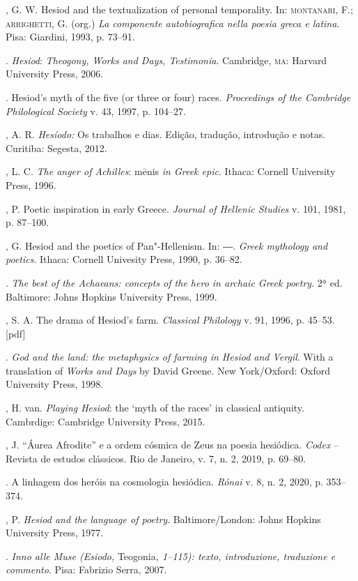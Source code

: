 \begin{bibliohedra}
, G. W. Hesiod and the textualization of personal temporality. In:
\textsc{montanari}, F.; \textsc{arrighetti}, G. (org.) \emph{La componente autobiografica
nella poesia greca e latina}. Pisa: Giardini, 1993, p. 73--91.

\titidem. \emph{Hesiod}: \emph{Theogony, Works and Days, Testimonia}.
Cambridge, \textsc{ma}: Harvard University Press, 2006.

\titidem. Hesiod's myth of the five (or three or four) races. \emph{Proceedings
of the Cambridge Philological Society} v. 43, 1997, p. 104--27.

, A. R. \emph{Hesíodo:} Os trabalhos e dias. Edição, tradução,
introdução e notas. Curitiba: Segesta, 2012.

, L. C. \emph{The anger of Achilles}: mēnis \emph{in Greek
epic}. Ithaca: Cornell University Press, 1996.

, P. Poetic inspiration in early Greece. \emph{Journal of Hellenic
Studies} v. 101, 1981, p. 87--100.

, G. Hesiod and the poetics of Pan"-Hellenism. In: ―. \emph{Greek
mythology and poetics}. Ithaca: Cornell Univesity Press, 1990, p. 36--82.

\titidem. \emph{The best of the Achaeans: concepts of the hero in archaic Greek
poetry}. 2ª ed. Baltimore: Johns Hopkins University Press, 1999.

, S. A. The drama of Hesiod's farm. \emph{Classical Philology} v.
91, 1996, p. 45--53. {[}pdf{]}

\titidem. \emph{God and the land: the metaphysics of farming in Hesiod and
Vergil}. With a translation of \emph{Works and Days} by David Greene.
New York/Oxford: Oxford University Press, 1998.

, H. van. \emph{Playing Hesiod}: the `myth of the races' in
classical antiquity. Cambrdige: Cambridge University Press, 2015.

, J. ``Áurea Afrodite'' e a ordem cósmica de Zeus na poesia
hesiódica. \emph{Codex} -- Revista de estudos clássicos. Rio de Janeiro,
v. 7, n. 2, 2019, p. 69--80.

\titidem. A linhagem dos heróis na cosmologia hesiódica. \emph{Rónai} v. 8, n.
2, 2020, p. 353--374.

, P. \emph{Hesiod and the language of poetry}. Baltimore/London:
Johns Hopkins University Press, 1977.

\titidem. \emph{Inno alle Muse (Esiodo,} Teogonia\emph{, 1--115): texto,
introduzione, traduzione e commento}. Pisa: Fabrizio Serra, 2007.


\end{bibliohedra}
